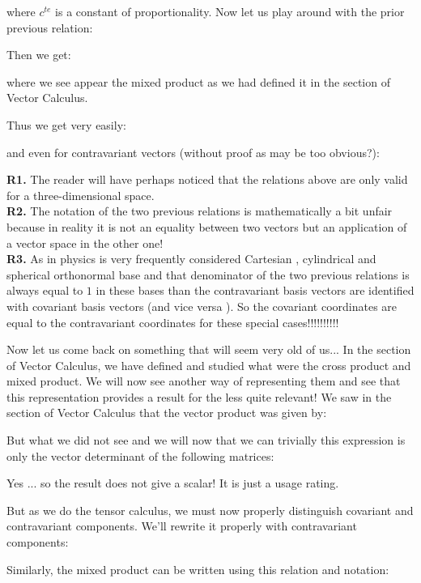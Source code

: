 	where $c^{te}$ is a constant of proportionality. Now let us play around with the prior previous relation:
	
	Then we get:
	
	where we see appear the mixed product as we had defined it in the section of Vector Calculus.
	
	Thus we get very easily:
	
	and even for contravariant vectors (without proof as may be too obvious?):
	
	\begin{tcolorbox}[title=Remarks,colframe=black,arc=10pt]
	\textbf{R1.} The reader will have perhaps noticed that the relations above are only valid for a three-dimensional space.\\
	
	\textbf{R2.} The notation of the two previous relations is mathematically a bit unfair because in reality it is not an equality between two vectors but an application of a vector space in the other one!\\
	
	\textbf{R3.} As in physics is very frequently considered Cartesian , cylindrical and spherical orthonormal base and that denominator of the two previous relations is always equal to $1$ in these bases than the contravariant basis vectors are identified with covariant basis vectors (and vice versa ). So the covariant coordinates are equal to the contravariant coordinates for these special cases!!!!!!!!!! 
	\end{tcolorbox}	
	Now let us come back on something that will seem very old of us... In the section of Vector Calculus, we have defined and studied what were the cross product and mixed product. We will now see another way of representing them and see that this representation provides a result for the less quite relevant!
	We saw in the section of Vector Calculus that the vector product was given by:
	
	But what we did not see and we will now that we can trivially this expression is only the vector determinant of the following matrices:
	
	Yes ... so the result does not give a scalar! It is just a usage rating.
	
	But as we do the tensor calculus, we must now properly distinguish covariant and contravariant components. We'll rewrite it properly with contravariant components:
	
	Similarly, the mixed product can be written using this relation and notation:
	
